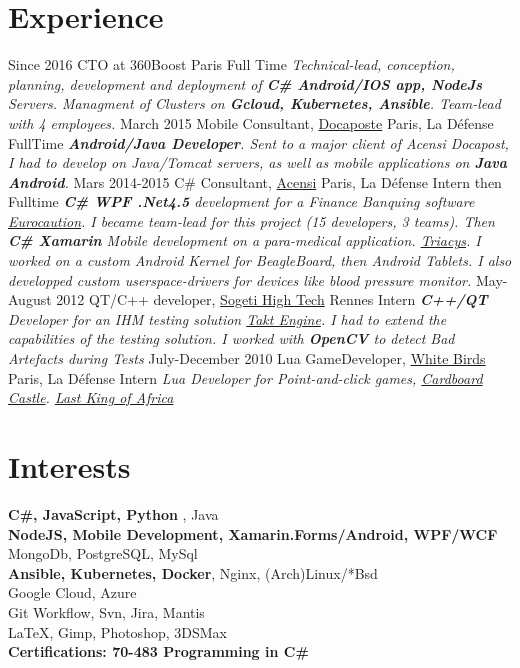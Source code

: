 \documentclass{emonides-cv}
\begin{document}
\section{Experience}
\begin{entrylist}
  \entry
    {Since  2016}
    {CTO at 360Boost {\normalfont Paris}}
    {Full Time}
    {\emph{Technical-lead, conception, planning, development and deployment of \textbf{C\# Android/IOS app, NodeJs} Servers.
     Managment of Clusters on \textbf{Gcloud, Kubernetes, Ansible}. Team-lead with 4 employees.}}
  \entry
    {March 2015}
    {Mobile Consultant, \href{https://www.docapost.com/en/}{Docaposte} {\normalfont Paris, La Défense}}
    {FullTime}
    {\emph{\textbf{Android/Java Developer}. Sent to a major client of Acensi Docapost, I had to develop on Java/Tomcat servers, as well as mobile applications on \textbf{Java Android}.}}
  \entry
    {Mars 2014-2015}
    {C\# Consultant, \href{https://www.acensi.fr/}{Acensi} {\normalfont Paris, La Défense}}
    {Intern then Fulltime}
    {\emph{\textbf{C\# WPF .Net4.5} development for a Finance Banquing software \href{https://www.eurocaution.net/}{Eurocaution}.
    I became team-lead for this project (15 developers, 3 teams).
    Then \textbf{C\# Xamarin} Mobile development on a para-medical application. \href{http://www.triacys.com/}{Triacys}.
    I worked on a custom Android Kernel for BeagleBoard, then Android Tablets. I also developped custom userspace-drivers for devices like blood pressure monitor.}}
  \entry
    {May-August 2012}
    {QT/C++ developer, \href{https://www.acensi.fr/}{Sogeti High Tech} {\normalfont Rennes}}
    {Intern}
    {\emph{\textbf{C++/QT} Developer for an IHM testing solution \href{https://www.eurocaution.net/}{Takt Engine}.
    I had to extend the capabilities of the testing solution. I worked with \textbf{OpenCV} to detect Bad Artefacts during Tests }}
  \entry
    {July-December 2010}
    {Lua GameDeveloper, \href{https://www.giantbomb.com/white-birds-productions/3010-5637/}{White Birds} {\normalfont Paris, La Défense}}
    {Intern}
    {\emph{Lua Developer for Point-and-click games, \href{https://www.bigfishgames.com/games/6859/cardboard-castle/}{Cardboard Castle}. \href{https://www.wikiwand.com/fr/White_Birds_Productions}{Last King of Africa}}}
\end{entrylist}

\section{Interests}
  \textbf{C\#, JavaScript, Python} , Java\\
  \textbf { NodeJS, Mobile Development, Xamarin.Forms/Android, WPF/WCF}  \\
  MongoDb, PostgreSQL, MySql\\
  \textbf { Ansible, Kubernetes, Docker}, Nginx, (Arch)Linux/*Bsd \\
  Google Cloud, Azure \\
  Git Workflow, Svn, Jira, Mantis\\
  \LaTeX, Gimp, Photoshop, 3DSMax\\
  \textbf { Certifications: 70-483 Programming in C\# }
\end{document}

